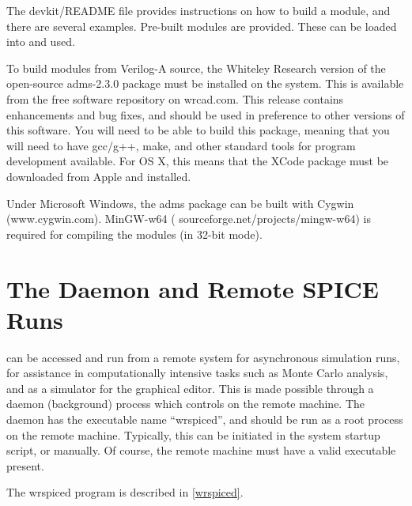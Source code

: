 The {\vt devkit/README} file provides instructions on how to build a
module, and there are several examples.  Pre-built modules are
provided.  These can be loaded into {\WRspice} and used.

To build modules from Verilog-A source, the Whiteley Research version
of the open-source {\vt adms-2.3.0} package must be installed on the
system.  This is available from the free software repository on {\vt
wrcad.com}.  This release contains enhancements and bug fixes, and
should be used in preference to other versions of this software.  You
will need to be able to build this package, meaning that you will need
to have {\vt gcc/g++}, {\vt make}, and other standard tools for
program development available.  For OS X, this means that the XCode
package must be downloaded from Apple and installed.

Under Microsoft Windows, the {\vt adms} package can be built with
Cygwin ({\vt www.cygwin.com}).  MinGW-w64 ({\vt
sourceforge.net/projects/mingw-w64}) is required for compiling the
modules (in 32-bit mode).


\section{The {\WRspice} Daemon and Remote SPICE Runs}


{\WRspice} can be accessed and run from a remote system for
asynchronous simulation runs, for assistance in computationally
intensive tasks such as Monte Carlo analysis, and as a simulator for
the {\Xic} graphical editor.  This is made possible through a daemon
(background) process which controls {\WRspice} on the remote
machine.  The daemon has the executable name ``wrspiced'', and
should be run as a root process on the remote machine.  Typically,
this can be initiated in the system startup script, or manually.  Of
course, the remote machine must have a valid {\WRspice} executable
present.

The {\vt wrspiced} program is described in \ref{wrspiced}.

